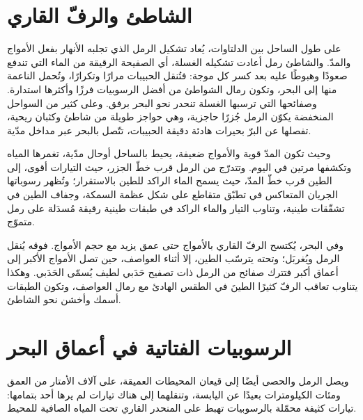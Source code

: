 \section{الشاطئ والرفّ القاري}\label{sec:b1:clastic-sediments:shoreline}

على طول الساحل بين الدلتاوات، يُعاد تشكيل الرمل الذي تجلبه الأنهار بفعل الأمواج والمدّ. والشاطئ رمل أعادت تشكيله الغسلة، أي الصفيحة الرقيقة من الماء التي تندفع صعودًا وهبوطًا عليه بعد كسر كل موجة: فتُنقل الحبيبات مرارًا وتكرارًا، وتُحمل الناعمة منها إلى البحر، وتكون رمال الشواطئ من أفضل الرسوبيات فرزًا وأكثرها استدارة. وصفائحها التي ترسبها الغسلة تنحدر نحو البحر برفق. وعلى كثير من السواحل المنخفضة يكوّن الرمل جُزرًا حاجزية، وهي حواجز طويلة من شاطئ وكثبان ريحية، تفصلها عن البرّ بحيرات هادئة دقيقة الحبيبات، تتّصل بالبحر عبر مداخل مدّية.

وحيث تكون المدّ قوية والأمواج ضعيفة، يحيط بالساحل أوحال مدّية، تغمرها المياه وتكشفها مرتين في اليوم. وتتدرّج من الرمل قرب خطّ الجزر، حيث التيارات أقوى، إلى الطين قرب خطّ المدّ، حيث يسمح الماء الراكد للطين بالاستقرار؛ وتُظهر رسوباتها الجريان المتعاكس في تطبّق متقاطع على شكل عظمة السمكة، وجفاف الطين في تشقّقات طينية، وتناوب التيار والماء الراكد في طبقات طينية رقيقة مُسدَلة على رمل متموّج.

وفي البحر، يُكتسح الرفّ القاري بالأمواج حتى عمق يزيد مع حجم الأمواج. فوقه يُنقل الرمل ويُغربَل؛ وتحته يترسّب الطين، إلا أثناء العواصف، حين تصل الأمواج الأكبر إلى أعماق أكبر فتترك صفائح من الرمل ذات تصفيح حَدَبي لطيف يُسمّى  الحَدَبي. وهكذا يتناوب تعاقب الرفّ كثيرًا الطينَ في الطقس الهادئ مع رمال العواصف، وتكون الطبقات أسمك وأخشن نحو الشاطئ.

\section{الرسوبيات الفتاتية في أعماق البحر}\label{sec:b1:clastic-sediments:deep-sea}

ويصل الرمل والحصى أيضًا إلى قيعان المحيطات العميقة، على آلاف الأمتار من العمق ومئات الكيلومترات بعيدًا عن اليابسة، وتنقلهما إلى هناك تيارات لم يرها أحد بتمامها: تيارات كثيفة محمّلة بالرسوبيات تهبط على المنحدر القاري تحت المياه الصافية للمحيط.

